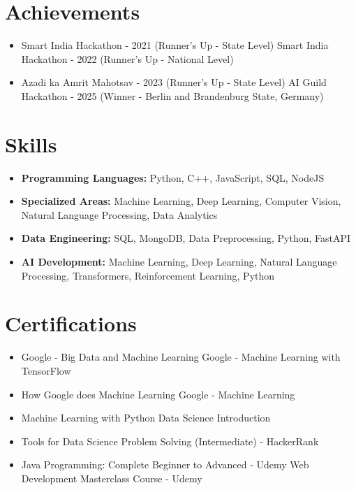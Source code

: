 \documentclass[a4paper,10pt]{article}
\begin{document}
\section*{Achievements}
\begin{itemize}
\item Smart India Hackathon - 2021 (Runner's Up - State Level) \hfill Smart India Hackathon - 2022 (Runner's Up - National Level)
\item Azadi ka Amrit Mahotsav - 2023 (Runner's Up - State Level) \hfill AI Guild Hackathon - 2025 (Winner - Berlin and Brandenburg State, Germany)
\end{itemize}

\section*{Skills}
\begin{itemize}
  \item \textbf{Programming Languages:} Python, C++, JavaScript, SQL, NodeJS
  \item \textbf{Specialized Areas:} Machine Learning, Deep Learning, Computer Vision, Natural Language Processing, Data Analytics
  \item \textbf{Data Engineering:} SQL, MongoDB, Data Preprocessing, Python, FastAPI
  \item \textbf{AI Development:} Machine Learning, Deep Learning, Natural Language Processing, Transformers, Reinforcement Learning, Python
\end{itemize}

\section*{Certifications}
\begin{itemize}
\item Google - Big Data and Machine Learning \hfill Google - Machine Learning with TensorFlow
\item How Google does Machine Learning \hfill Google - Machine Learning
\item Machine Learning with Python \hfill Data Science Introduction
\item Tools for Data Science \hfill Problem Solving (Intermediate) - HackerRank
\item Java Programming: Complete Beginner to Advanced - Udemy \hfill Web Development Masterclass Course - Udemy
\end{itemize}
\end{document}
